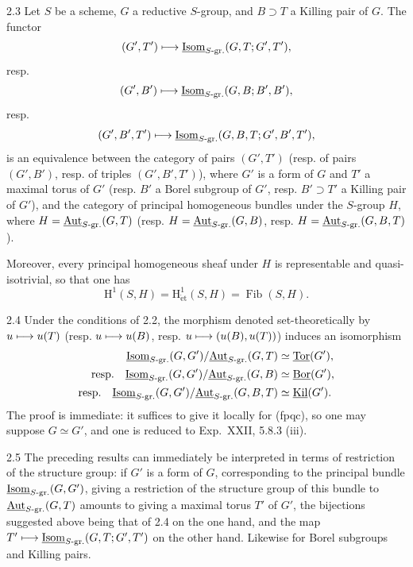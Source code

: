 \begin{corollary}{2.3}\label{XXIV.2.3}
Let $S$ be a scheme, $G$ a reductive $S$-group, and $B\supset T$ a Killing pair of $G$. The functor
\[
(G',T')\longmapsto\underline{\operatorname{Isom}}_{S\text{-gr.}}(G,T;G',T'),
\]
resp.
\[
(G',B')\longmapsto\underline{\operatorname{Isom}}_{S\text{-gr.}}(G,B;B',B'),
\]
resp.
\[
(G',B',T')\longmapsto\underline{\operatorname{Isom}}_{S\text{-gr.}}(G,B,T;G',B',T'),
\]
is an equivalence between the category of pairs $(G',T')$ (resp. of pairs $(G',B')$, resp. of triples $(G',B',T')$), where $G'$ is a form of $G$ and $T'$ a maximal torus of $G'$ (resp. $B'$ a Borel subgroup of $G'$, resp. $B'\supset T'$ a Killing pair of $G'$), and the category of principal homogeneous bundles under the $S$-group $H$, where $H=\underline{\operatorname{Aut}}_{S\text{-gr.}}(G,T)$ (resp. $H=\underline{\operatorname{Aut}}_{S\text{-gr.}}(G,B)$, resp. $H=\underline{\operatorname{Aut}}_{S\text{-gr.}}(G,B,T)$).

Moreover, every principal homogeneous sheaf under $H$ is representable and quasi-isotrivial, so that one has
\[
\mathrm H^1(S,H)=\mathrm H^1_{\mathrm{\acute et}}(S,H)=\operatorname{Fib}(S,H).
\]
\end{corollary}
\begin{remark}{2.4}\label{XXIV.2.4}
Under the conditions of 2.2, the morphism denoted set-theoretically by $u\longmapsto u(T)$ (resp. $u\longmapsto u(B)$, resp. $u\longmapsto(u(B),u(T))$) induces an isomorphism
\[
\begin{aligned}
\underline{\operatorname{Isom}}_{S\text{-gr.}}(G,G')/\underline{\operatorname{Aut}}_{S\text{-gr.}}(G,T)&\simeq\underline{\operatorname{Tor}}(G'),\\
\text{resp.}\quad \underline{\operatorname{Isom}}_{S\text{-gr.}}(G,G')/\underline{\operatorname{Aut}}_{S\text{-gr.}}(G,B)&\simeq\underline{\operatorname{Bor}}(G'),\\
\text{resp.}\quad \underline{\operatorname{Isom}}_{S\text{-gr.}}(G,G')/\underline{\operatorname{Aut}}_{S\text{-gr.}}(G,B,T)&\simeq\underline{\operatorname{Kil}}(G').
\end{aligned}
\]
The proof is immediate: it suffices to give it locally for (fpqc), so one may suppose $G\simeq G'$, and one is reduced to Exp.~XXII, 5.8.3 (iii).
\end{remark}
\begin{remark}{2.5}\label{XXIV.2.5}
The preceding results can immediately be interpreted in terms of restriction of the structure group: if $G'$ is a form of $G$, corresponding to the principal bundle $\underline{\operatorname{Isom}}_{S\text{-gr.}}(G,G')$, giving a restriction of the structure group of this bundle to $\underline{\operatorname{Aut}}_{S\text{-gr.}}(G,T)$ amounts to giving a maximal torus $T'$ of $G'$, the bijections suggested above being that of 2.4 on the one hand, and the map $T'\longmapsto\underline{\operatorname{Isom}}_{S\text{-gr.}}(G,T;G',T')$ on the other hand. Likewise for Borel subgroups and Killing pairs.
\end{remark}
